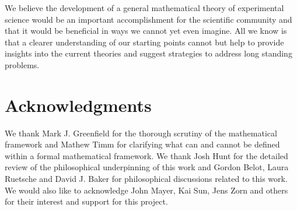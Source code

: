 \documentclass[twocolumn]{article}
\begin{document}
We believe the development of a general mathematical theory of experimental science would be an important accomplishment for the scientific community and that it would be beneficial in ways we cannot yet even imagine. All we know is that a clearer understanding of our starting points cannot but help to provide insights into the current theories and suggest strategies to address long standing problems.

\section{Acknowledgments}

We thank Mark J. Greenfield for the thorough scrutiny of the mathematical framework and Mathew Timm for clarifying what can and cannot be defined within a formal mathematical framework. We thank Josh Hunt for the detailed review of the philosophical underpinning of this work and Gordon Belot, Laura Ruetsche and David J. Baker for philosophical discussions related to this work. We would also like to acknowledge John Mayer, Kai Sun, Jens Zorn and others for their interest and support for this project.



\end{document}
